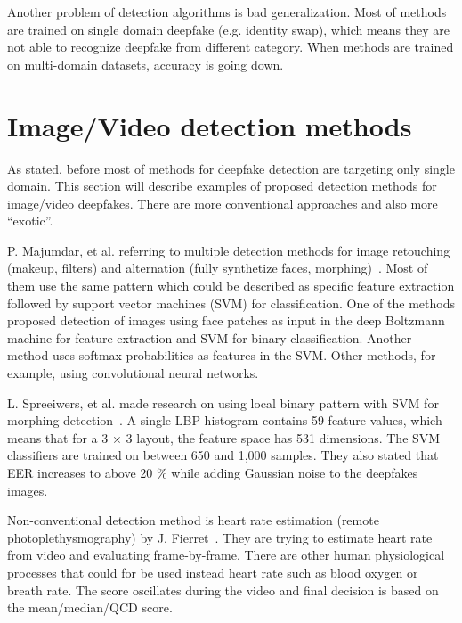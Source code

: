 Another problem of detection algorithms is bad generalization. Most of methods are trained on single domain deepfake (e.g. identity swap), which means they are not able to recognize deepfake from different category. When methods are trained on multi-domain datasets, accuracy is going down.~\cite{FacialRetouchingAndAlterationDetection}

\section{Image/Video detection methods}

As stated, before most of methods for deepfake detection are targeting only single domain. This section will describe examples of proposed detection methods for image/video deepfakes. There are more conventional approaches and also more “exotic”.

P. Majumdar, et al. referring to multiple detection methods for image retouching (makeup, filters) and alternation (fully synthetize faces, morphing)~\cite{FacialRetouchingAndAlterationDetection}. Most of them use the same pattern which could be described as specific feature extraction followed by support vector machines (SVM) for classification. One of the methods proposed detection of images using face patches as input in the deep Boltzmann machine for feature extraction and SVM for binary classification. Another method uses softmax probabilities as features in the SVM. Other methods, for example, using convolutional neural networks.~\cite{FacialRetouchingAndAlterationDetection}

L. Spreeiwers, et al. made research on using local binary pattern with SVM for morphing detection~\cite{PracticalEvaluationOfFaceMorphingAttackDetectionMethods}. A single LBP histogram contains 59 feature values, which means that for a 3 × 3 layout, the feature space has 531 dimensions. The SVM classifiers are trained on between 650 and 1,000 samples. They also stated that EER increases to above 20 \% while adding Gaussian noise to the deepfakes images.

Non-conventional detection method is heart rate estimation (remote photoplethysmography) by J. Fierret~\cite{DetectionBasedOnHeartRateEstimation}. They are trying to estimate heart rate from video and evaluating frame-by-frame. There are other human physiological processes that could for be used instead heart rate such as blood oxygen or breath rate. The score oscillates during the video and final decision is based on the mean/median/QCD score.


